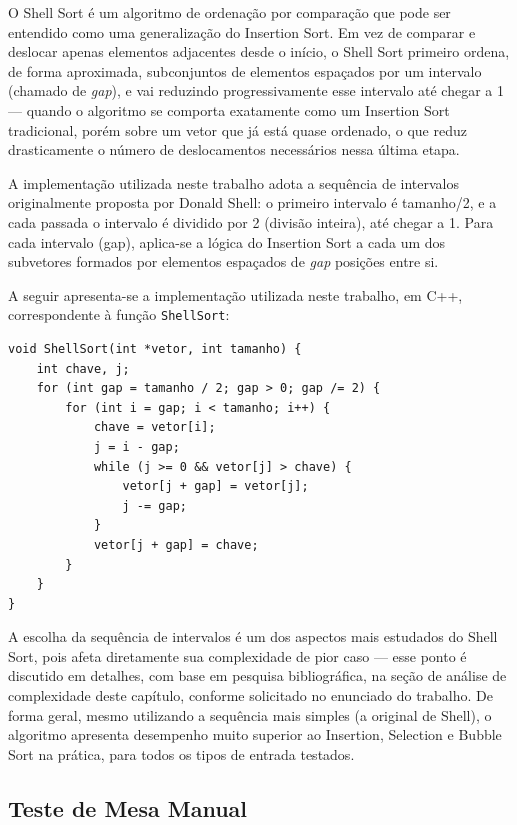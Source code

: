 \qquad O Shell Sort é um algoritmo de ordenação por comparação que pode ser
entendido como uma generalização do Insertion Sort. Em vez de comparar
e deslocar apenas elementos adjacentes desde o início, o Shell Sort
primeiro ordena, de forma aproximada, subconjuntos de elementos
espaçados por um intervalo (chamado de \textit{gap}), e vai reduzindo
progressivamente esse intervalo até chegar a 1 — quando o algoritmo se
comporta exatamente como um Insertion Sort tradicional, porém sobre um
vetor que já está quase ordenado, o que reduz drasticamente o número
de deslocamentos necessários nessa última etapa.

\qquad A implementação utilizada neste trabalho adota a sequência de
intervalos originalmente proposta por Donald Shell: o primeiro
intervalo é tamanho/2, e a cada passada o intervalo é dividido por 2
(divisão inteira), até chegar a 1. Para cada intervalo (gap), aplica-se
a lógica do Insertion Sort a cada um dos subvetores formados por
elementos espaçados de \textit{gap} posições entre si.

\qquad A seguir apresenta-se a implementação utilizada neste trabalho, em
C++, correspondente à função \texttt{ShellSort}:

\begin{verbatim}
void ShellSort(int *vetor, int tamanho) {
    int chave, j;
    for (int gap = tamanho / 2; gap > 0; gap /= 2) {
        for (int i = gap; i < tamanho; i++) {
            chave = vetor[i];
            j = i - gap;
            while (j >= 0 && vetor[j] > chave) {
                vetor[j + gap] = vetor[j];
                j -= gap;
            }
            vetor[j + gap] = chave;
        }
    }
}
\end{verbatim}

\qquad A escolha da sequência de intervalos é um dos aspectos mais
estudados do Shell Sort, pois afeta diretamente sua complexidade de
pior caso — esse ponto é discutido em detalhes, com base em pesquisa
bibliográfica, na seção de análise de complexidade deste capítulo,
conforme solicitado no enunciado do trabalho. De forma geral, mesmo
utilizando a sequência mais simples (a original de Shell), o algoritmo
apresenta desempenho muito superior ao Insertion, Selection e Bubble
Sort na prática, para todos os tipos de entrada testados.

\subsection{Teste de Mesa Manual}

